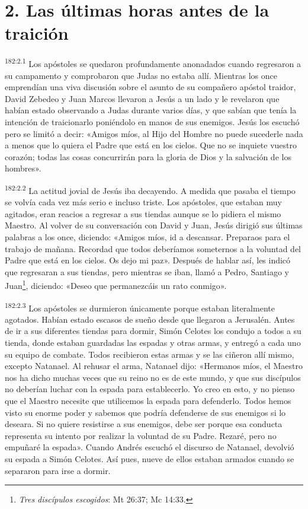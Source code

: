 \section*{2. Las últimas horas antes de la traición}
\par 
\textsuperscript{182:2.1} Los apóstoles se quedaron profundamente anonadados cuando regresaron a su campamento y comprobaron que Judas no estaba allí. Mientras los once emprendían una viva discusión sobre el asunto de su compañero apóstol traidor, David Zebedeo y Juan Marcos llevaron a Jesús a un lado y le revelaron que habían estado observando a Judas durante varios días, y que sabían que tenía la intención de traicionarlo poniéndolo en manos de sus enemigos. Jesús los escuchó pero se limitó a decir: «Amigos míos, al Hijo del Hombre no puede sucederle nada a menos que lo quiera el Padre que está en los cielos. Que no se inquiete vuestro corazón; todas las cosas concurrirán para la gloria de Dios y la salvación de los hombres».

\par 
\textsuperscript{182:2.2} La actitud jovial de Jesús iba decayendo. A medida que pasaba el tiempo se volvía cada vez más serio e incluso triste. Los apóstoles, que estaban muy agitados, eran reacios a regresar a sus tiendas aunque se lo pidiera el mismo Maestro. Al volver de su conversación con David y Juan, Jesús dirigió sus últimas palabras a los once, diciendo: «Amigos míos, id a descansar. Preparaos para el trabajo de mañana. Recordad que todos deberíamos someternos a la voluntad del Padre que está en los cielos. Os dejo mi paz». Después de hablar así, les indicó que regresaran a sus tiendas, pero mientras se iban, llamó a Pedro, Santiago y Juan\footnote{\textit{Tres discípulos escogidos}: Mt 26:37; Mc 14:33.}, diciendo: «Deseo que permanezcáis un rato conmigo».

\par 
\textsuperscript{182:2.3} Los apóstoles se durmieron únicamente porque estaban literalmente agotados. Habían estado escasos de sueño desde que llegaron a Jerusalén. Antes de ir a sus diferentes tiendas para dormir, Simón Celotes los condujo a todos a su tienda, donde estaban guardadas las espadas y otras armas, y entregó a cada uno su equipo de combate. Todos recibieron estas armas y se las ciñeron allí mismo, excepto Natanael. Al rehusar el arma, Natanael dijo: «Hermanos míos, el Maestro nos ha dicho muchas veces que su reino no es de este mundo, y que sus discípulos no deberían luchar con la espada para establecerlo. Yo creo en esto, y no pienso que el Maestro necesite que utilicemos la espada para defenderlo. Todos hemos visto su enorme poder y sabemos que podría defenderse de sus enemigos si lo deseara. Si no quiere resistirse a sus enemigos, debe ser porque esa conducta representa su intento por realizar la voluntad de su Padre. Rezaré, pero no empuñaré la espada». Cuando Andrés escuchó el discurso de Natanael, devolvió su espada a Simón Celotes. Así pues, nueve de ellos estaban armados cuando se separaron para irse a dormir.

